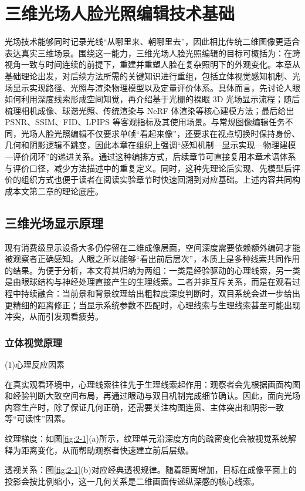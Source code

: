 \chapter{三维光场人脸光照编辑技术基础}
光场技术能够同时记录光线“从哪里来、朝哪里去”，因此相比传统二维图像更适合表达真实三维场景。围绕这一能力，三维光场人脸光照编辑的目标可概括为：在跨视角一致与时间连续的前提下，重建并重塑人脸在复杂照明下的外观变化。本章从基础理论出发，对后续方法所需的关键知识进行重组，包括立体视觉感知机制、光场显示实现路径、光照与渲染物理模型以及定量评价体系。具体而言，先讨论人眼如何利用深度线索形成空间知觉，再介绍基于光栅的裸眼 3D 光场显示流程；随后梳理相机成像、球谐光照、传统渲染与 NeRF 体渲染等核心建模方法；最后给出 PSNR、SSIM、FID、LPIPS 等客观指标及其使用场景。与常规图像编辑任务不同，光场人脸光照编辑不仅要求单帧“看起来像”，还要求在视点切换时保持身份、几何和阴影逻辑不跳变，因此本章在组织上强调“感知机制—显示实现—物理建模—评价闭环”的递进关系。通过这种编排方式，后续章节可直接复用本章术语体系与评价口径，减少方法描述中的重复定义。同时，这种先理论后实现、先模型后评价的组织方式也便于读者在阅读实验章节时快速回溯到对应基础。上述内容共同构成本文第二章的理论底座。
\section{三维光场显示原理}
现有消费级显示设备大多仍停留在二维成像层面，空间深度需要依赖额外编码才能被观察者正确感知。人眼之所以能够“看出前后层次”，本质上是多种线索共同作用的结果。为便于分析，本文将其归纳为两组：一类是经验驱动的心理线索，另一类是由眼球结构与神经处理直接产生的生理线索。二者并非互斥关系，而是在观看过程中持续融合：当前景和背景纹理给出粗粒度深度判断时，双目系统会进一步给出更精细的距离修正；当显示系统参数不匹配时，心理线索与生理线索甚至可能出现冲突，从而引发观看疲劳。
\subsection{立体视觉原理}
(1)心理反应因素

在真实观看环境中，心理线索往往先于生理线索起作用：观察者会先根据画面构图和经验判断大致空间布局，再通过眼动与双目机制完成细节确认。因此，面向光场内容生产时，除了保证几何正确，还需要关注构图连贯、主体突出和阴影一致等“可读性”因素。

纹理梯度：如图\ref{fig:2-1}(a)所示，纹理单元沿深度方向的疏密变化会被视觉系统解释为距离变化，从而帮助观察者快速建立前后层级\cite{Gibson1950}。

透视关系：图\ref{fig:2-1}(b)对应经典透视规律。随着距离增加，目标在成像平面上的投影会按比例缩小，这一几何关系是二维画面传递纵深感的核心线索\cite{Kaufman2000}。

